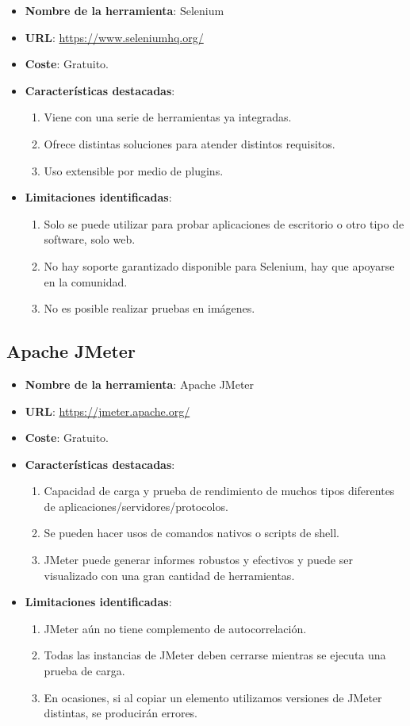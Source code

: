 \begin{itemize}
	\item \textbf{Nombre de la herramienta}: Selenium
	\item \textbf{URL}: \url{https://www.seleniumhq.org/}
	\item \textbf{Coste}: Gratuito.
	\item \textbf{Características destacadas}:
	\begin{enumerate}
		\item Viene con una serie de herramientas ya integradas.
		\item Ofrece distintas soluciones para atender distintos requisitos.
		\item Uso extensible por medio de plugins.
	\end{enumerate}
	\item \textbf{Limitaciones identificadas}:
	\begin{enumerate}
		\item Solo se puede utilizar para probar aplicaciones de escritorio o otro tipo de software, solo web. 
		\item No hay soporte garantizado disponible para Selenium, hay que apoyarse en la comunidad.
		\item No es posible realizar pruebas en imágenes.
	\end{enumerate}
\end{itemize}

\subsection{Apache JMeter}

\begin{itemize}
	\item \textbf{Nombre de la herramienta}: Apache JMeter
	\item \textbf{URL}: \url{https://jmeter.apache.org/}
	\item \textbf{Coste}: Gratuito.
	\item \textbf{Características destacadas}:
	\begin{enumerate}
		\item Capacidad de carga y prueba de rendimiento de muchos tipos diferentes de aplicaciones/servidores/protocolos.
		\item Se pueden hacer usos de comandos nativos o scripts de shell.
		\item JMeter puede generar informes robustos y efectivos y puede ser visualizado con una gran cantidad de herramientas.
	\end{enumerate}
	\item \textbf{Limitaciones identificadas}:
	\begin{enumerate}
		\item JMeter aún no tiene complemento de autocorrelación.
		\item Todas las instancias de JMeter deben cerrarse mientras se ejecuta una prueba de carga.
		\item En ocasiones, si al copiar un elemento utilizamos versiones de JMeter distintas, se producirán errores.
	\end{enumerate}
\end{itemize}

